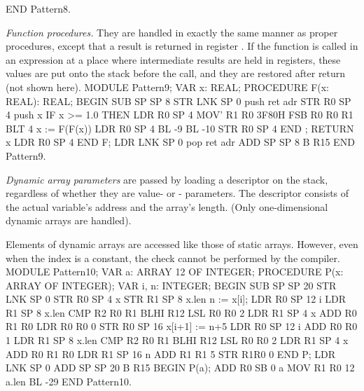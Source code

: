 END Pattern8.
\endtt

\noindent {} \emph{Function procedures.} They are handled in exactly the same manner as proper procedures, except that a result is returned in register . If the function is called in an expression at a place where intermediate results are held in registers, these values are put onto the stack before the call, and they are restored after return (not shown here).
\begintt
MODULE Pattern9;
  VAR x: REAL;
  PROCEDURE F(x: REAL): REAL;
  BEGIN                SUB  SP SP 8
                       STR  LNK SP 0      push ret adr
                       STR  R0 SP 4       push x
    IF x >= 1.0 THEN   LDR  R0 SP 4
                       MOV' R1 R0 3F80H
                       FSB  R0 R0 R1
                       BLT  4
      x := F(F(x))     LDR  R0 SP 4
                       BL   -9
                       BL   -10
                       STR  R0 SP 4
    END ;                                
    RETURN x           LDR  R0 SP 4
  END F;               LDR  LNK SP 0      pop ret adr
                       ADD  SP SP 8
                       B    R15
END Pattern9.
\endtt

\noindent {} \emph{Dynamic array parameters} are passed by loading a descriptor on the stack, regardless of whether they are value- or - parameters. The descriptor consists of the actual variable's address and the array's length. (Only one-dimensional dynamic arrays are handled).

Elements of dynamic arrays are accessed like those of static arrays. However, even when the index is a constant, the check cannot be performed by the compiler.
\begintt
MODULE Pattern10;
  VAR a: ARRAY 12 OF INTEGER;
  PROCEDURE P(x: ARRAY OF INTEGER);
    VAR i, n: INTEGER;
  BEGIN               SUB  SP SP 20
                      STR  LNK SP 0
                      STR  R0 SP 4    x
                      STR  R1 SP 8    x.len
    n := x[i];        LDR  R0 SP 12   i
                      LDR  R1 SP 8    x.len
                      CMP  R2 R0 R1
                      BLHI R12
                      LSL  R0 R0 2
                      LDR  R1 SP 4    x
                      ADD  R0 R1 R0
                      LDR  R0 R0 0
                      STR  R0 SP 16
    x[i+1] := n+5     LDR  R0 SP 12   i
                      ADD  R0 R0 1
                      LDR  R1 SP 8    x.len
                      CMP  R2 R0 R1
                      BLHI R12
                      LSL  R0 R0 2
                      LDR  R1 SP 4    x
                      ADD  R0 R1 R0
                      LDR  R1 SP 16   n
                      ADD  R1 R1 5
                      STR  R1R0 0
  END P;              LDR  LNK SP 0
                      ADD  SP SP 20
                      B    R15
  BEGIN P(a);         ADD  R0 SB 0    a
                      MOV  R1 R0 12   a.len
                      BL   -29
END Pattern10.
\endtt

